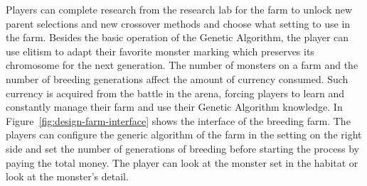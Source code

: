 \documentclass[12pt,oneside,openright,a4paper]{cpe-english-project}
\begin{document}
\begin{itemize}
\begin{enumerate}
Players can complete research from the research lab for the farm to unlock new parent selections and new crossover methods and choose what setting to use in the farm. Besides the basic operation of the Genetic Algorithm, the player can use elitism to adapt their favorite monster marking which preserves its chromosome for the next generation. The number of monsters on a farm and the number of breeding generations affect the amount of currency consumed. Such currency is acquired from the battle in the arena, forcing players to learn and constantly manage their farm and use their Genetic Algorithm knowledge. In Figure~\ref{fig:design-farm-interface} shows the interface of the breeding farm. The players can configure the generic algorithm of the farm in the setting on the right side and set the number of generations of breeding before starting the process by paying the total money. The player can look at the monster set in the habitat or look at the monster's detail.

	\begin{minipage}[c]{\textwidth}\centering
	\label{fig:design-farm-interface}
	\end{minipage}


\end{enumerate}
\end{itemize}
\end{document}
